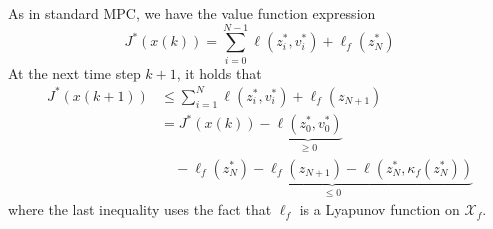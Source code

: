 \begin{examplesection}
    As in standard MPC, we have the value function expression
    \begin{equation*}
        J^*(x(k)) = \sum_{i=0}^{N-1} \ell(z_i^*, v_i^*) + \ell_f(z_N^*)
    \end{equation*}
    At the next time step $k + 1$, it holds that
    \begin{align*}
        J^*(x(k + 1)) & \leq \sum_{i=1}^{N} \ell(z_i^*, v_i^*) + \ell_f(z_{N+1})                                     \\
                      & = J^*(x(k)) - \underbrace{\ell(z_0^*, v_0^*)}_{\geq 0}                                       \\
                      & \quad - \underbrace{\ell_f(z_N^*) - \ell_f(z_{N+1}) - \ell(z_N^*, \kappa_f(z_N^*))}_{\leq 0}
    \end{align*}
    where the last inequality uses the fact that $\ell_f$ is a Lyapunov function on $\mathcal{X}_f$.
\end{examplesection}


